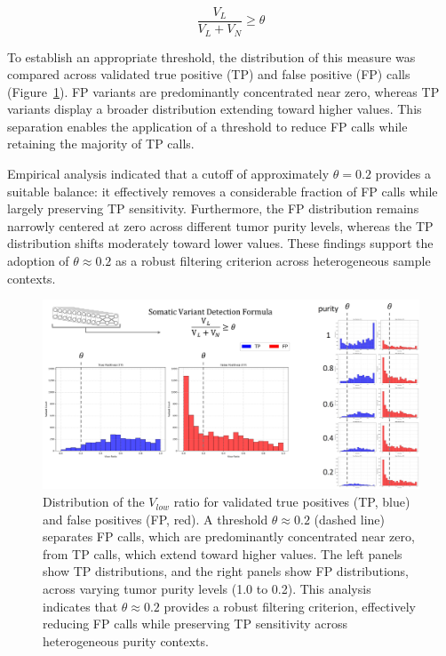 \documentclass[pdflatex,sn-nature]{sn-jnl}
\def\pandocbounded#1{%
  \begingroup
  \setkeys{Gin}{width=1.0\linewidth,height=1.0\textheight,keepaspectratio}%
  #1%
  \endgroup
}
\begin{document}
$$
\frac{V_L}{V_L + V_N} \geq \theta
$$

To establish an appropriate threshold, the distribution of this measure was compared across validated true positive (TP) and false positive (FP) calls (Figure~\ref{fig:app-page-40-cropped-jpg}). FP variants are predominantly concentrated near zero, whereas TP variants display a broader distribution extending toward higher values. This separation enables the application of a threshold to reduce FP calls while retaining the majority of TP calls.

Empirical analysis indicated that a cutoff of approximately \(\theta = 0.2\) provides a suitable balance: it effectively removes a considerable fraction of FP calls while largely preserving TP sensitivity. Furthermore, the FP distribution remains narrowly centered at zero across different tumor purity levels, whereas the TP distribution shifts moderately toward lower values. These findings support the adoption of \(\theta \approx 0.2\) as a robust filtering criterion across heterogeneous sample contexts.

\begin{figure}
\centering
\pandocbounded{\includegraphics[keepaspectratio]{page_40_cropped.jpg}}
\caption[Low-confidence variant filtering using $V_{low}$ ratio.]{Distribution of the $V_{low}$ ratio for validated true positives (TP, blue) and false positives (FP, red). A threshold \(\theta \approx 0.2\) (dashed line) separates FP calls, which are predominantly concentrated near zero, from TP calls, which extend toward higher values. The left panels show TP distributions, and the right panels show FP distributions, across varying tumor purity levels (1.0 to 0.2). This analysis indicates that \(\theta \approx 0.2\) provides a robust filtering criterion, effectively reducing FP calls while preserving TP sensitivity across heterogeneous purity contexts.}\label{fig:app-page-40-cropped-jpg}
\end{figure}
\end{document}
